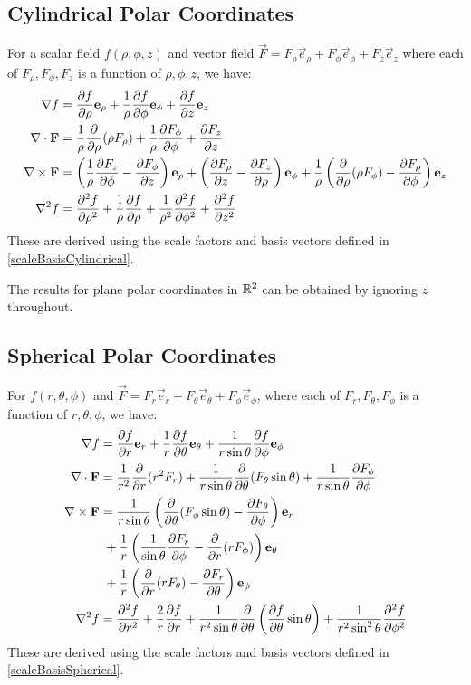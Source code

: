 \documentclass[../main.tex]{subfiles}
\begin{document}
\subsection{Cylindrical Polar Coordinates}
\label{cylindricalOperators}
For a scalar field $f(\rho, \phi, z)$ and vector field $\vec{F} = F_\rho \vec{e}_\rho + F_\phi \vec{e}_\phi + F_z \vec{e}_z$ where each of $F_\rho, F_\phi, F_z$ is a function of $\rho, \phi, z$, we have:
\begin{align*}
  \nabla f &= \pderiv{f}{\rho} \vec{e}_\rho + \frac{1}{\rho}\pderiv{f}{\phi} \vec{e}_\phi + \pderiv{f}{z} \vec{e}_z \\
  \nabla \cdot \vec{F} &= \frac{1}{\rho} \pderiv{}{\rho}(\rho F_\rho) + \frac{1}{\rho} \pderiv{F_\phi}{\phi} + \pderiv{F_z}{z} \\
  \nabla \times \vec{F} &= \left(\frac{1}{\rho} \pderiv{F_z}{\phi} - \pderiv{F_\phi}{z}\right)\vec{e}_\rho + \left(\pderiv{F_\rho}{z} - \pderiv{F_z}{\rho}\right)\vec{e}_\phi + \frac{1}{\rho}\left(\pderiv{}{\rho}(\rho F_\phi) - \pderiv{F_\rho}{\phi}\right) \vec{e}_z \\
  \nabla^2 f &= \pderiv[2]{f}{\rho} + \frac{1}{\rho} \pderiv{f}{\rho} + \frac{1}{\rho^2} \pderiv[2]{f}{\phi} + \pderiv[2]{f}{z}
\end{align*}
These are derived using the scale factors and basis vectors defined in \cref{scaleBasisCylindrical}.
\begin{remark}
  The results for plane polar coordinates in $\mathbb{R}^2$ can be obtained by ignoring $z$ throughout.
\end{remark}
\subsection{Spherical Polar Coordinates}
\label{sphericalOperators}
For $f(r, \theta, \phi)$ and $\vec{F} = F_r \vec{e}_r + F_\theta \vec{e}_\theta + F_\phi \vec{e}_\phi$, where each of $F_r, F_\theta, F_\phi$ is a function of $r, \theta, \phi$, we have:
\begin{align*}
  \nabla f &= \pderiv{f}{r} \vec{e}_r + \frac{1}{r} \pderiv{f}{\theta} \vec{e}_\theta + \frac{1}{r \sin \theta} \pderiv{f}{\phi} \vec{e}_\phi \\
  \nabla \cdot \vec{F} &= \frac{1}{r^2} \pderiv{}{r}(r^2 F_r) + \frac{1}{r \sin \theta} \pderiv{}{\theta}(F_\theta \sin \theta) + \frac{1}{r \sin \theta} \pderiv{F_\phi}{\phi} \\
  \nabla \times \vec{F} &= \frac{1}{r \sin \theta} \left(\pderiv{}{\theta}(F_\phi \sin \theta) - \pderiv{F_\theta}{\phi}\right)\vec{e}_r \\
                        &\ + \frac{1}{r}\left(\frac{1}{\sin \theta} \pderiv{F_r}{\phi} - \pderiv{}{r}(rF_\phi)\right) \vec{e}_\theta \\
                        &\ + \frac{1}{r}\left(\pderiv{}{r}(r F_\theta) - \pderiv{F_r}{\theta}\right) \vec{e}_\phi \\
  \nabla^2 f &= \pderiv[2]{f}{r} + \frac{2}{r} \pderiv{f}{r} + \frac{1}{r^2 \sin \theta} \pderiv{}{\theta}\left(\pderiv{f}{\theta} \sin \theta\right) + \frac{1}{r^2 \sin^2 \theta} \pderiv[2]{f}{\phi}
\end{align*}
These are derived using the scale factors and basis vectors defined in \cref{scaleBasisSpherical}.
\end{document}

